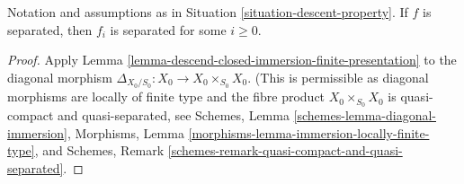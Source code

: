 \begin{lemma}
\label{lemma-descend-separated-finite-presentation}
Notation and assumptions as in Situation \ref{situation-descent-property}.
If $f$ is separated, then $f_i$ is separated for some $i \geq 0$.
\end{lemma}

\begin{proof}
Apply Lemma \ref{lemma-descend-closed-immersion-finite-presentation}
to the diagonal morphism $\Delta_{X_0/S_0} : X_0 \to X_0 \times_{S_0} X_0$.
(This is permissible as diagonal morphisms are locally of finite type
and the fibre product $X_0 \times_{S_0} X_0$ is quasi-compact and
quasi-separated, see
Schemes, Lemma \ref{schemes-lemma-diagonal-immersion},
Morphisms, Lemma \ref{morphisms-lemma-immersion-locally-finite-type}, and
Schemes, Remark \ref{schemes-remark-quasi-compact-and-quasi-separated}.
\end{proof}
